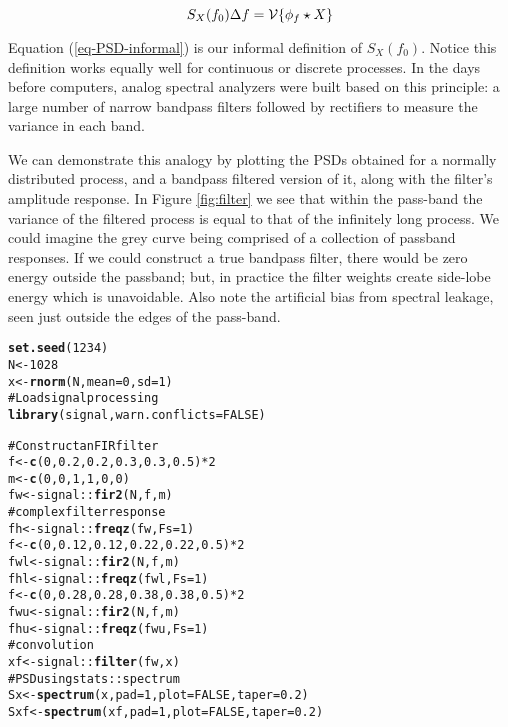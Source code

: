 \documentclass[11pt]{article}\usepackage{graphicx, color}
\makeatletter
\newcommand{\hlfunctioncall}[1]{\textcolor[rgb]{0.501960784313725,0,0.329411764705882}{\textbf{#1}}}%
\newcommand{\hlcomment}[1]{\textcolor[rgb]{0.180392156862745,0.6,0.341176470588235}{#1}}%
\newenvironment{kframe}{%
 \def\at@end@of@kframe{}%
 \ifinner\ifhmode%
  \def\at@end@of@kframe{\end{minipage}}%
  \begin{minipage}{\columnwidth}%
 \fi\fi%
 \def\FrameCommand##1{\hskip\@totalleftmargin \hskip-\fboxsep
 \colorbox{shadecolor}{##1}\hskip-\fboxsep
     \hskip-\linewidth \hskip-\@totalleftmargin \hskip\columnwidth}%
 \MakeFramed {\advance\hsize-\width
   \@totalleftmargin\z@ \linewidth\hsize
   \@setminipage}}%
 {\par\unskip\endMakeFramed%
 \at@end@of@kframe}
\newenvironment{knitrout}{}{} %
\makeatother
\begin{document}
\begin{equation}
\label{eq-PSD-informal}
S_X ( f_0 ) \Delta f = \mathcal{V} \{\phi_f \star X\}
\end{equation}

Equation (\ref{eq-PSD-informal}) is our informal definition of $S_X ( f_0 )$. 
Notice this definition works equally well for continuous
or discrete processes. 
In the days before computers, 
analog spectral analyzers were built based on this 
principle: a large number of narrow bandpass filters
followed by rectifiers to measure the variance in each band.

We can demonstrate this analogy by plotting the 
PSDs obtained for a normally distributed process, and
a bandpass filtered version of it, along with
the filter's amplitude response.
In Figure \ref{fig:filter} we see that
within the pass-band the variance
of the filtered process
is equal to that of the infinitely long process.
We could imagine the grey curve being comprised of a 
collection of passband responses.
If we could construct a true bandpass filter, there would be 
zero energy outside the passband; but, in practice 
the filter weights create side-lobe 
energy which is unavoidable.
Also note the artificial bias
from spectral leakage, seen just outside the 
edges of the pass-band.
%
\begin{knitrout}
\color{fgcolor}\begin{kframe}
\begin{alltt}
\hlfunctioncall{set.seed}(1234)
N <- 1028
x <- \hlfunctioncall{rnorm}(N, mean = 0, sd = 1)
\hlcomment{# Load signal processing}
\hlfunctioncall{library}(signal, warn.conflicts = FALSE)
\end{alltt}


{\ttfamily\noindent\itshape\color{messagecolor}{\#\# Loading required package: MASS}}\begin{alltt}
\hlcomment{# Construct an FIR filter}
f <- \hlfunctioncall{c}(0, 0.2, 0.2, 0.3, 0.3, 0.5) * 2
m <- \hlfunctioncall{c}(0, 0, 1, 1, 0, 0)
fw <- signal::\hlfunctioncall{fir2}(N, f, m)
\hlcomment{# complex filter response}
fh <- signal::\hlfunctioncall{freqz}(fw, Fs = 1)
f <- \hlfunctioncall{c}(0, 0.12, 0.12, 0.22, 0.22, 0.5) * 2
fwl <- signal::\hlfunctioncall{fir2}(N, f, m)
fhl <- signal::\hlfunctioncall{freqz}(fwl, Fs = 1)
f <- \hlfunctioncall{c}(0, 0.28, 0.28, 0.38, 0.38, 0.5) * 2
fwu <- signal::\hlfunctioncall{fir2}(N, f, m)
fhu <- signal::\hlfunctioncall{freqz}(fwu, Fs = 1)
\hlcomment{# convolution}
xf <- signal::\hlfunctioncall{filter}(fw, x)
\hlcomment{# PSD using stats::spectrum}
Sx <- \hlfunctioncall{spectrum}(x, pad = 1, plot = FALSE, taper = 0.2)
Sxf <- \hlfunctioncall{spectrum}(xf, pad = 1, plot = FALSE, taper = 0.2)
\end{alltt}
\end{kframe}
\end{knitrout}
\end{document}
